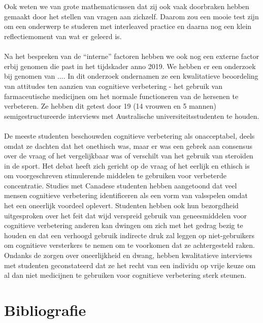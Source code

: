 \documentclass{article}
\begin{document}
	\\\\
	Ook weten we van grote mathematicussen dat zij ook vaak doorbraken hebben gemaakt door het stellen van vragen aan zichzelf. Daarom zou een mooie test zijn om een onderwerp te studeren met interleaved practice en daarna nog een klein reflectiemoment van wat er geleerd is.
	\\\\
	Na het bespreken van de “interne” factoren hebben we ook nog een externe factor erbij genomen die past in het tijdskader anno 2019. We hebben er een onderzoek bij genomen van ....
	In dit onderzoek ondernamen ze een kwalitatieve beoordeling van attitudes ten aanzien van cognitieve verbetering - het gebruik van farmaceutische medicijnen om het normale functioneren van de hersenen te verbeteren. Ze hebben dit getest door 19 (14 vrouwen en 5 mannen) semigestructureerde interviews met Australische universiteitsstudenten te houden. 
	\\\\
	De meeste studenten beschouwden cognitieve verbetering als onacceptabel, deels omdat ze dachten dat het onethisch was, maar er was een gebrek aan consensus over de vraag of het vergelijkbaar was of verschilt van het gebruik van steroïden in de sport. 
	Het debat heeft zich gericht op de vraag of het eerlijk en ethisch is om voorgeschreven stimulerende middelen te gebruiken voor verbeterde concentratie. Studies met Canadese studenten hebben aangetoond dat veel mensen cognitieve verbetering identificeren als een vorm van valsspelen omdat het een oneerlijk voordeel oplevert. Studenten hebben ook hun bezorgdheid uitgesproken over het feit dat wijd verspreid gebruik van geneesmiddelen voor cognitieve verbetering anderen kan dwingen om zich met het gedrag bezig te houden en dat een verhoogd gebruik indirecte druk zal leggen op niet-gebruikers om cognitieve versterkers te nemen om te voorkomen dat ze achtergesteld raken. Ondanks de zorgen over oneerlijkheid en dwang, hebben kwalitatieve interviews met studenten geconstateerd dat ze het recht van een individu op vrije keuze om al dan niet medicijnen te gebruiken voor cognitieve verbetering sterk steunen.
	
	
\newpage
\section{Bibliografie}



\newpage
\citet{art1}\\
\citet{art2}\\
\citet{art3}\\
\citet{art4}\\
\citet{art5}\\
\citet{art6}\\
\citet{art7}\\
\citet{art8}\\
\end{document}
